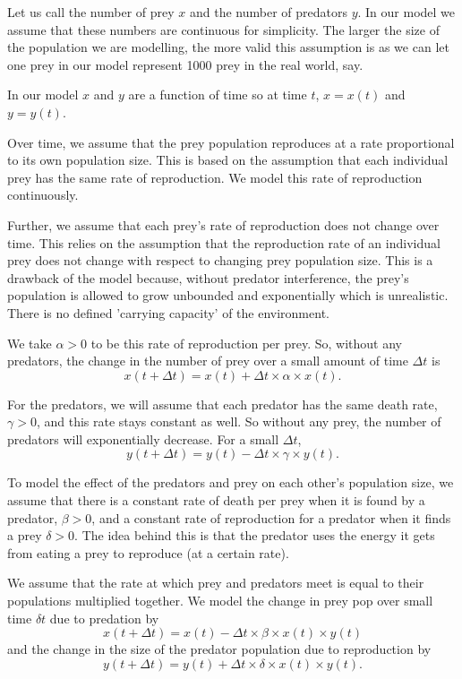 \documentclass[12pt, a4paper]{article}
\begin{document}
Let us call the number of prey $x$ and the number of predators $y$. In our model we assume that these numbers are continuous for simplicity. The larger the size of the population we are modelling, the more valid this assumption is as we can let one prey in our model represent 1000 prey in the real world, say.

In our model $x$ and $y$ are a function of time so at time $t$, $x=x(t)$ and $y=y(t)$.

Over time, we assume that the prey population reproduces at a rate proportional to its own population size. This is based on the assumption that each individual prey has the same rate of reproduction. We model this rate of reproduction continuously.

Further, we assume that each prey's rate of reproduction does not change over time. This relies on the assumption that the reproduction rate of an individual prey does not change with respect to changing prey population size. This is a drawback of the model because, without predator interference, the prey's population is allowed to grow unbounded and exponentially which is unrealistic. There is no defined 'carrying capacity' of the environment.

We take $\alpha > 0$ to be this rate of reproduction per prey. So, without any predators, the change in the number of prey over a small amount of time $\Delta t$ is
\begin{equation}
x(t + \Delta t) = x(t) + \Delta t \times \alpha \times x(t).
\end{equation}

For the predators, we will assume that each predator has the same death rate, $\gamma > 0$, and this rate stays constant as well. So without any prey, the number of predators will exponentially decrease. For a small $\Delta t$,
\begin{equation}
y(t + \Delta t) = y(t) - \Delta t \times \gamma \times y(t).
\end{equation}

To model the effect of the predators and prey on each other's population size, we assume that there is a constant rate of death per prey when it is found by a predator, $\beta > 0$, and a constant rate of reproduction for a predator when it finds a prey $\delta > 0$. The idea behind this is that the predator uses the energy it gets from eating a prey to reproduce (at a certain rate).

We assume that the rate at which prey and predators meet is equal to their populations multiplied together. We model the change in prey pop over small time $\delta t$ due to predation by
\begin{equation}
x(t + \Delta t) = x(t) - \Delta t \times \beta \times x(t) \times y(t)
\end{equation}
and the change in the size of the predator population due to reproduction by
\begin{equation}
y(t + \Delta t) = y(t) + \Delta t \times \delta \times x(t) \times y(t).
\end{equation}
\end{document}
